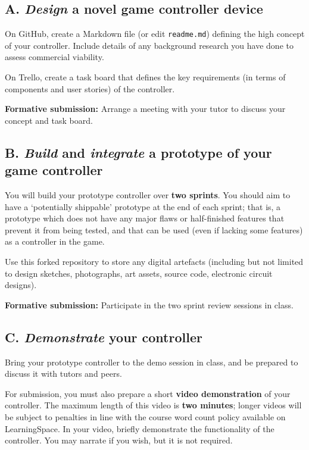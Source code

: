 \documentclass{../fal_assignment}
\begin{document}
\subsection*{A. \emph{Design} a novel game controller device}

On GitHub, create a Markdown file (or edit \texttt{readme.md})
defining the high concept of your controller.
Include details of any background research you have done to assess commercial viability.

On Trello, create a task board that defines the key requirements
(in terms of components and user stories) of the controller.

\textbf{Formative submission:} Arrange a meeting with your tutor to discuss your concept and task board.

\subsection*{B. \emph{Build} and  \emph{integrate} a prototype of your game controller}

You will build your prototype controller over \textbf{two sprints}.
You should aim to have a `potentially shippable' prototype at the end of each sprint;
that is, a prototype which does not have any major flaws or half-finished features that prevent it from being tested,
and that can be used (even if lacking some features) as a controller in the game.

Use this forked repository to store any digital artefacts (including but not limited to
design sketches, photographs, art assets, source code, electronic circuit designs).

\textbf{Formative submission:} Participate in the two sprint review sessions in class.

\subsection*{C. \emph{Demonstrate} your controller}

Bring your prototype controller to the demo session in class,
and be prepared to discuss it with tutors and peers.

For submission, you must also prepare a short \textbf{video demonstration} of your controller.
The maximum length of this video is \textbf{two minutes};
longer videos will be subject to penalties in line with the course word count policy available on LearningSpace.
In your video, briefly demonstrate the functionality of the controller.
You may narrate if you wish, but it is not required.
\end{document}
